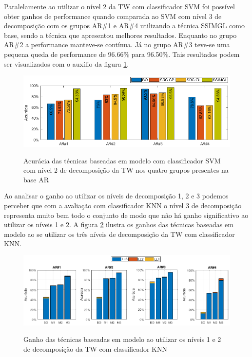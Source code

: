 Paralelamente ao utilizar o nível 2 da TW com classificador SVM foi possível obter ganhos de performance quando comparada ao SVM com nível 3 de decomposição com os grupos AR\#1 e AR\#4 utilizando a técnica SSIMGL como base, sendo a técnica que apresentou melhores resultados. Enquanto no grupo AR\#2 a performance manteve-se contínua. Já no grupo AR\#3 teve-se uma pequena queda de performance de 96.66\% para 96.50\%. Tais resultados podem ser visualizados com o auxílio da figura \ref{fig:acuracia_modelo_SVM_nivel2}.

\begin{figure}[H]
\centering
\caption{Acurácia das técnicas baseadas em modelo com classificador SVM com nível 2 de decomposição da TW nos quatro grupos presentes na base AR}
\includegraphics[scale=0.52]{imgs4/acuracia/nivel_one_two/SVM_nivel2_modelo}
\label{fig:acuracia_modelo_SVM_nivel2}
\end{figure}




Ao analisar o ganho ao utilizar os níveis de decomposição 1, 2 e 3 podemos perceber que com a avaliação com classificador KNN o nível 3 de decomposição representa muito bem todo  o conjunto de modo que não há ganho significativo ao utilizar os níveis 1 e 2. A figura \ref{fig:acuracia_ganho_modelo_KNN} ilustra os ganhos das técnicas baseadas em modelo ao se utilizar os três níveis de decomposição da TW com classificador KNN.

\begin{figure}[H]
\centering
\caption{Ganho das técnicas baseadas em modelo ao utilizar os níveis 1 e 2 de decomposição da TW com classificador KNN }
\includegraphics[scale=0.52]{imgs4/ganhos/ganho_modelo_KNN_niveis}
\label{fig:acuracia_ganho_modelo_KNN}
\end{figure}

